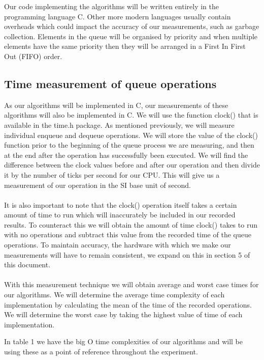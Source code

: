 \documentclass[12pt]{article}
\begin{document}
Our code implementing the algorithms will be written entirely in the programming language C. Other more modern languages usually contain overheads which could impact the accuracy of our measurements, such as garbage collection. Elements in the queue will be organised by priority and when multiple elements have the same priority then they will be arranged in a First In First Out (FIFO) order.

\subsection{Time measurement of queue operations}

As our algorithms will be implemented in C, our measurements of these algorithms will also be implemented in C. We will use the function clock() that is available in the time.h package. As mentioned previously, we will measure individual enqueue and dequeue operations. We will store the value of the clock() function prior to the beginning of the queue process we are measuring, and then at the end after the operation has successfully been executed. We will find the difference between the clock values before and after our operation and then divide it by the number of ticks per second for our CPU.  This will give us a measurement of our operation in the SI base unit of second.
\\
\\
It is also important to note that the clock() operation itself takes a certain amount of time to run which will inaccurately be included in our recorded results. To counteract this we will obtain the amount of time clock()  takes to run with no operations and subtract this value from the recorded time of the queue operations. To maintain accuracy, the hardware with which we make our measurements will have to remain consistent, we expand on this in section 5 of this document. 
\\
\\
With this measurement technique we will obtain average and worst case times for our algorithms. We will determine the average time complexity of each implementation by calculating the mean of the time of the recorded operations. We will determine the worst case by taking the highest value of time of each implementation.

In table 1 we have the big O time complexities of our algorithms and will be using these as a point of reference throughout the experiment.    
\end{document}
